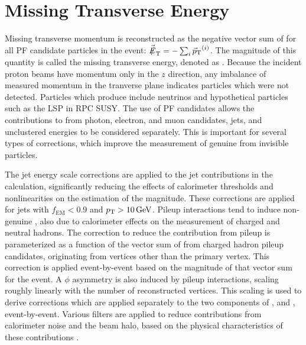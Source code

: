 \section{Missing Transverse Energy
\label{sec:met}}

Missing transverse momentum is reconstructed as the negative vector sum of \vecpt for all PF candidate particles in the event: $\vecmet = - \sum_{i} \vecpt^{(i)}$. The magnitude of this quantity is called the missing transverse energy, denoted as \met. Because the incident proton beams have momentum only in the $z$ direction, any imbalance of measured momentum in the tranverse plane indicates particles which were not detected. Particles which produce \met include neutrinos and hypothetical particles such as the LSP in RPC SUSY. The use of PF candidates allows the contributions to \met from photon, electron, and muon candidates, jets, and unclustered energies to be considered separately. This is important for several types of corrections, which improve the measurement of genuine \met from invisible particles.

The jet energy scale corrections are applied to the jet contributions in the \MET calculation, significantly reducing the effects of calorimeter thresholds and nonlinearities on the estimation of the \MET magnitude. These corrections are applied for jets with $f_{\text{EM}}<0.9$ and $p_{\mathrm{T}}>10\,\text{Ge\hspace{-.08em}V}$. Pileup interactions tend to induce non-genuine \MET, also due to calorimeter effects on the measurement of charged and neutral hadrons. The correction to reduce the contribution from pileup is parameterized as a function of the vector sum of \vecpt from charged hadron pileup candidates, originating from vertices other than the primary vertex. This correction is applied event-by-event based on the magnitude of that vector sum for the event. A $\phi$ asymmetry is also induced by pileup interactions, scaling roughly linearly with the number of reconstructed vertices. This scaling is used to derive corrections which are applied separately to the two components of \met, \mex and \mey, event-by-event. Various filters are applied to reduce contributions from calorimeter noise and the beam halo, based on the physical characteristics of these contributions \cite{METperf2011}.
